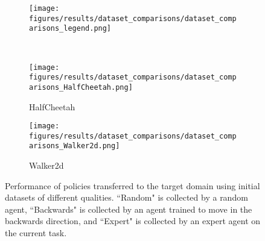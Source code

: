 




\begin{figure}[t]
    \centering
    \begin{subfigure}[t]{0.7\linewidth}        
        \texttt{[image: figures/results/dataset\_comparisons/dataset\_comparisons\_legend.png]}
    \end{subfigure}
    \\
    \begin{subfigure}[t]{0.48\linewidth}
        \texttt{[image: figures/results/dataset\_comparisons/dataset\_comparisons\_HalfCheetah.png]}
        \caption{HalfCheetah}
    \end{subfigure}
    \begin{subfigure}[t]{0.48\linewidth}
        \texttt{[image: figures/results/dataset\_comparisons/dataset\_comparisons\_Walker2d.png]}
        \caption{Walker2d}
    \end{subfigure}
    \caption{
        Performance of policies transferred to the target domain using initial datasets of different qualities.  ``Random" is collected by a random agent, ``Backwards" is collected by an agent trained to move in the backwards direction, and ``Expert" is collected by an expert agent on the current task.
    }
\label{fig:dataset_exps}
\end{figure}


